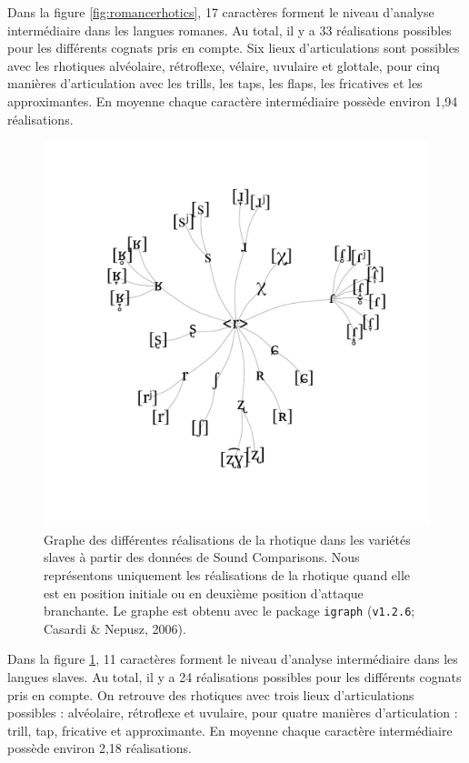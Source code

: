 Dans la figure \ref{fig:romancerhotics}, 17 caractères forment le niveau d'analyse intermédiaire dans les langues romanes. Au total, il y a 33 réalisations possibles pour les différents cognats pris en compte.
Six lieux d'articulations sont possibles avec les rhotiques alvéolaire, rétroflexe, vélaire, uvulaire et glottale, pour cinq manières d'articulation avec les trills, les taps, les flaps, les fricatives et les approximantes.
En moyenne chaque caractère intermédiaire possède environ 1,94 réalisations.\\

\begin{figure}
	\centering
	\includegraphics[width=\linewidth]{substance/images/slavic_rhotics}
	\caption[Graphe des différentes réalisations de la rhotique dans les variétés slaves]{Graphe des différentes réalisations de la rhotique dans les variétés slaves à partir des données de Sound Comparisons. Nous représentons uniquement les réalisations de la rhotique quand elle est en position initiale ou en deuxième position d'attaque branchante. Le graphe est obtenu avec le package \texttt{igraph} (\texttt{v1.2.6}; Casardi \& Nepusz, 2006).}
	\label{fig:slavicrhotics}
\end{figure}

Dans la figure \ref{fig:slavicrhotics}, 11 caractères forment le niveau d'analyse intermédiaire dans les langues slaves. Au total, il y a 24 réalisations possibles pour les différents cognats pris en compte.
On retrouve des rhotiques avec trois lieux d'articulations possibles : alvéolaire, rétroflexe et uvulaire, pour quatre manières d'articulation : trill, tap,  fricative et approximante.
En moyenne chaque caractère intermédiaire possède environ 2,18 réalisations.\\

